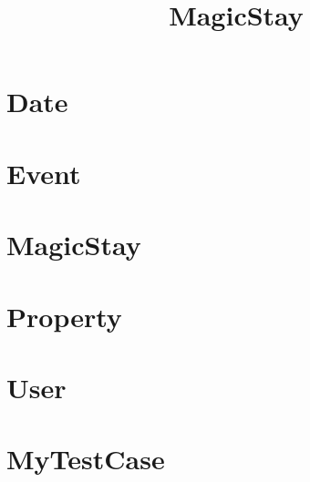 \documentclass{article}
\begin{document}
\title{MagicStay}
\author{}
\maketitle
\tableofcontents

\section{Date}

\section{Event}

\section{MagicStay}

\section{Property}

\section{User}

\section{MyTestCase}

\end{document}
